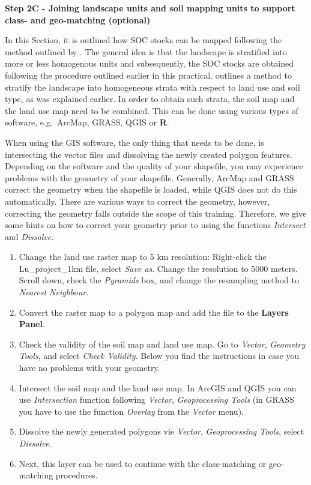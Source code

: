 \documentclass[10pt,b5paper,]{book}
\providecommand{\tightlist}{%
  \setlength{\itemsep}{0pt}\setlength{\parskip}{0pt}}
\theoremstyle{definition}
\theoremstyle{definition}
\theoremstyle{definition}
\theoremstyle{remark}
\begin{document}
\textbf{Step 2C - Joining landscape units and soil mapping units to
support class- and geo-matching (optional)}

In this Section, it is outlined how SOC stocks can be mapped following
the method outlined by \citet{lettens2004soil}. The general idea is that
the landscape is stratified into more or less homogenous units and
subsequently, the SOC stocks are obtained following the procedure
outlined earlier in this practical. \citet{lettens2004soil} outlines a
method to stratify the landscape into homogeneous strata with respect to
land use and soil type, as was explained earlier. In order to obtain
such strata, the soil map and the land use map need to be combined. This
can be done using various types of software, e.g.~ArcMap, GRASS, QGIS or
\textbf{R}.

When using the GIS software, the only thing that needs to be done, is
intersecting the vector files and dissolving the newly created polygon
features. Depending on the software and the quality of your shapefile,
you may experience problems with the geometry of your shapefile.
Generally, ArcMap and GRASS correct the geometry when the shapefile is
loaded, while QGIS does not do this automatically. There are various
ways to correct the geometry, however, correcting the geometry falls
outside the scope of this training. Therefore, we give some hints on how
to correct your geometry prior to using the functions \emph{Intersect}
and \emph{Dissolve}.

\begin{enumerate}
\def\labelenumi{\arabic{enumi}.}
\tightlist
\item
  Change the land use raster map to 5 km resolution: Right-click the
  Lu\_project\_1km file, select \emph{Save as}. Change the resolution to
  5000 meters. Scroll down, check the \emph{Pyramids} box, and change
  the resampling method to \emph{Nearest Neighbour}.
\item
  Convert the raster map to a polygon map and add the file to the
  \textbf{Layers Panel}.
\item
  Check the validity of the soil map and land use map. Go to
  \emph{Vector}, \emph{Geometry Tools}, and select \emph{Check
  Validity}. Below you find the instructions in case you have no
  problems with your geometry.
\item
  Intersect the soil map and the land use map. In ArcGIS and QGIS you
  can use \emph{Intersection} function following \emph{Vector},
  \emph{Geoprocessing Tools} (in GRASS you have to use the function
  \emph{Overlay} from the \emph{Vector} menu).
\item
  Dissolve the newly generated polygons vie \emph{Vector},
  \emph{Geoprocessing Tools}, select \emph{Dissolve}.
\item
  Next, this layer can be used to continue with the class-matching or
  geo-matching procedures.
\end{enumerate}
\end{document}
